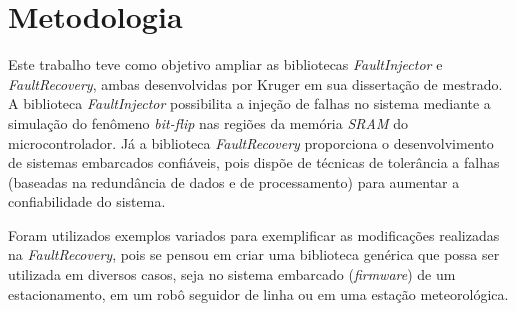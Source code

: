 
\chapter{Metodologia} \label{cap:metodologia}


Este trabalho teve como objetivo ampliar as bibliotecas \textit{FaultInjector} e \textit{FaultRecovery}, ambas desenvolvidas por Kruger \cite{Kruger:2014} em sua dissertação de mestrado. A biblioteca \textit{FaultInjector} possibilita a injeção de falhas no sistema mediante a simulação do fenômeno \textit{bit-flip} nas regiões da memória \textit{SRAM} do microcontrolador. Já a biblioteca \textit{FaultRecovery} proporciona o desenvolvimento de sistemas embarcados confiáveis, pois dispõe de técnicas de tolerância a falhas (baseadas na redundância de dados e de processamento) para aumentar a confiabilidade do sistema.

Foram utilizados exemplos variados para exemplificar as modificações realizadas na \textit{FaultRecovery}, pois se pensou em criar uma biblioteca genérica que possa ser utilizada em diversos casos, seja no sistema embarcado (\textit{firmware}) de um estacionamento, em um robô seguidor de linha ou em uma estação meteorológica.


